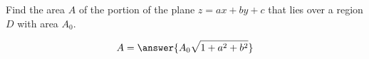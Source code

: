 \documentclass{ximera}
\author{David Guichard \and Neal Koblitz \and H. Jerome Keisler \and Albert Scheller \and Barry Balof \and Mike Wills \and Matthew Carr}
\begin{document}
\begin{exercise}




Find the area $A$ of the portion of the plane $z=ax+by+c$ that lies over a region $D$ with area $A_0$.
\begin{prompt}
\[
A=\answer{A_0 \sqrt{1+a^2+b^2}}
\]
\end{prompt}


\end{exercise}
\end{document}

